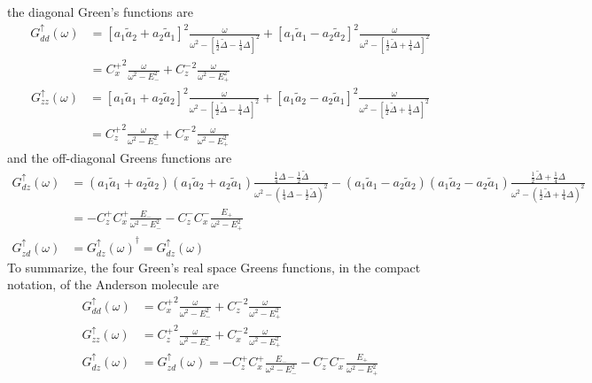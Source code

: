 \documentclass[12pt]{article}
\numberwithin{equation}{section}
\begin{document}
the diagonal Green's functions are
\begin{equation}\begin{aligned}
	\label{mole_local_G}
	G_{d d}^\uparrow(\omega) &= \left[a_1\tilde a_2 + a_2\tilde a_1\right]^2\frac{\omega}{\omega^2 - \left[\frac{1}{2}\tilde\Delta - \frac{1}{4}\Delta\right]^2 } +\left[a_1\tilde a_1 - a_2\tilde a_2\right]^2\frac{\omega}{\omega^2 - \left[\frac{1}{2}\tilde\Delta + \frac{1}{4}\Delta\right]^2 }\\
				 &= {C_x^+}^2\frac{\omega}{\omega^2 - E_{-}^2 } +{C_z^-}^2\frac{\omega}{\omega^2 - E_{+}^2 }
\end{aligned}\end{equation}
\begin{equation}\begin{aligned}
	G_{z z}^\uparrow(\omega) &= \left[a_1\tilde a_1 + a_2\tilde a_2\right]^2\frac{\omega}{\omega^2 - \left[\frac{1}{2}\tilde\Delta - \frac{1}{4}\Delta\right]^2 } +\left[a_1\tilde a_2 - a_2\tilde a_1\right]^2\frac{\omega}{\omega^2 - \left[\frac{1}{2}\tilde\Delta + \frac{1}{4}\Delta\right]^2 }\\
				 &= {C_z^+}^2\frac{\omega}{\omega^2 - E_{-}^2 } +{C_x^-}^2\frac{\omega}{\omega^2 - E_{+}^2 }
\end{aligned}\end{equation}
and the off-diagonal Greens functions are
\begin{equation}\begin{aligned}
	G_{dz}^\uparrow(\omega) &= \left(a_1 \tilde a_1 + a_2 \tilde a_2\right) \left(a_1 \tilde a_2 + a_2 \tilde a_1\right) \frac{\frac{1}{4}\Delta - \frac{1}{2}\tilde\Delta}{\omega^2 - \left(\frac{1}{4}\Delta - \frac{1}{2}\tilde\Delta\right)^2} - \left(a_1 \tilde a_1 - a_2 \tilde a_2\right) \left(a_1 \tilde a_2 - a_2 \tilde a_1\right) \frac{\frac{1}{2}\tilde\Delta + \frac{1}{4}\Delta}{\omega^2  - \left(\frac{1}{2}\tilde\Delta + \frac{1}{4}\Delta\right)^2}\\
				&= -C_z^+ C_x^+ \frac{E_{-}}{\omega^2 - E_{-}^2} - C_z^- C_x^- \frac{E_{+}}{\omega^2  - E_{+}^2}\\
G_{zd}^\uparrow(\omega) &= {G_{dz}^\uparrow(\omega)}^\dagger = G_{dz}^\uparrow(\omega)
\end{aligned}\end{equation}
To summarize, the four Green's real space Greens functions, in the compact notation, of the Anderson molecule are
\begin{equation}\begin{aligned}
	G_{dd}^\uparrow(\omega) &= {C_x^+}^2\frac{\omega}{\omega^2 - E_{-}^2 } +{C_z^-}^2\frac{\omega}{\omega^2 - E_{+}^2 }\\
	G_{zz}^\uparrow(\omega) &= {C_z^+}^2\frac{\omega}{\omega^2 - E_{-}^2 } +{C_x^-}^2\frac{\omega}{\omega^2 - E_{+}^2 }\\
	G_{dz}^\uparrow(\omega) &= G_{zd}^\uparrow(\omega) = -C_z^+ C_x^+ \frac{E_{-}}{\omega^2 - E_{-}^2} - C_z^- C_x^- \frac{E_{+}}{\omega^2  - E_{+}^2}
\end{aligned}\end{equation}



\end{document}
